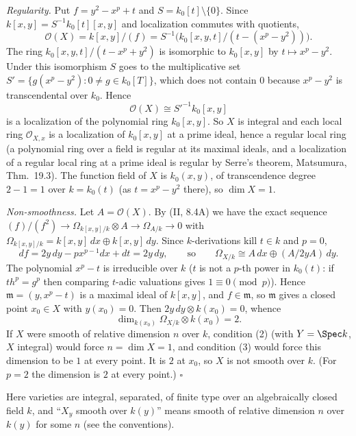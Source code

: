 \documentclass[11pt]{article}
\begin{document}
\pf
\emph{Regularity.} Put $f=y^2-x^p+t$ and $S=k_0[t]\setminus\{0\}$. Since $k[x,y]=S^{-1}k_0[t][x,y]$ and localization commutes with quotients,
\[
\mathcal O(X)=k[x,y]/(f)=S^{-1}\bigl(k_0[x,y,t]/(t-(x^p-y^2))\bigr).
\]
The ring $k_0[x,y,t]/(t-x^p+y^2)$ is isomorphic to $k_0[x,y]$ by $t\mapsto x^p-y^2$. Under this isomorphism $S$ goes to the multiplicative set $S'=\{g(x^p-y^2): 0\ne g\in k_0[T]\}$, which does not contain $0$ because $x^p-y^2$ is transcendental over $k_0$. Hence
\[
\mathcal O(X)\cong S'^{-1}k_0[x,y]
\]
is a localization of the polynomial ring $k_0[x,y]$. So $X$ is integral and each local ring $\mathcal O_{X,x}$ is a localization of $k_0[x,y]$ at a prime ideal, hence a regular local ring (a polynomial ring over a field is regular at its maximal ideals, and a localization of a regular local ring at a prime ideal is regular by Serre's theorem, Matsumura, Thm.~19.3). The function field of $X$ is $k_0(x,y)$, of transcendence degree $2-1=1$ over $k=k_0(t)$ (as $t=x^p-y^2$ there), so $\dim X=1$.

\emph{Non-smoothness.} Let $A=\mathcal O(X)$. By (II, 8.4A) we have the exact sequence $(f)/(f^2)\to\Omega_{k[x,y]/k}\otimes A\to\Omega_{A/k}\to0$ with $\Omega_{k[x,y]/k}=k[x,y]\,dx\oplus k[x,y]\,dy$. Since $k$-derivations kill $t\in k$ and $p=0$,
\[
df=2y\,dy-px^{p-1}dx+dt=2y\,dy,\qquad\text{so}\qquad \Omega_{X/k}\cong A\,dx\oplus (A/2yA)\,dy .
\]
The polynomial $x^p-t$ is irreducible over $k$ ($t$ is not a $p$-th power in $k_0(t)$: if $th^p=g^p$ then comparing $t$-adic valuations gives $1\equiv0\pmod p$). Hence $\mathfrak m=(y,x^p-t)$ is a maximal ideal of $k[x,y]$, and $f\in\mathfrak m$, so $\mathfrak m$ gives a closed point $x_0\in X$ with $y(x_0)=0$. Then $2y\,dy\otimes k(x_0)=0$, whence
\[
\dim_{k(x_0)}\Omega_{X/k}\otimes k(x_0)=2 .
\]
If $X$ were smooth of relative dimension $n$ over $k$, condition (2) (with $Y=\Spec k$, $X$ integral) would force $n=\dim X=1$, and condition (3) would force this dimension to be $1$ at every point. It is $2$ at $x_0$, so $X$ is not smooth over $k$. (For $p=2$ the dimension is $2$ at every point.) \hfill$\square$

\pf
Here varieties are integral, separated, of finite type over an algebraically closed field $k$, and ``$X_y$ smooth over $k(y)$'' means smooth of relative dimension $n$ over $k(y)$ for some $n$ (see the conventions).
\end{document}
